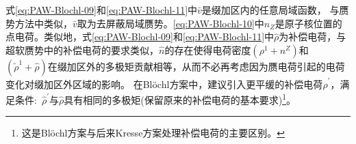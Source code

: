 {式\eqref{eq:PAW-Blochl-09}和\eqref{eq:PAW-Blochl-11}中$\bar v$是缀加区内的任意局域函数，%
与赝势方法中类似，$\bar v$取为去屏蔽局域赝势。\eqref{eq:PAW-Blochl-10}中$n_Z$是原子核位置的点电荷。类似地，式\eqref{eq:PAW-Blochl-09}和\eqref{eq:PAW-Blochl-11}中$\hat\rho$为补偿电荷，与超软赝势中的补偿电荷的要求类似，$\hat n$的存在使得电荷密度$(\rho^1+n^Z)$和$(\tilde\rho^1+\hat\rho)$在缀加区外的多极矩贡献相等，从而不必再考虑因为赝电荷引起的电荷变化对缀加区外区域的影响。%
在\textrm{Bl\"ochl}方案中，建议引入更平缓的补偿电荷$\hat\rho^{\prime}$，满足条件:~$\hat\rho^{\prime}$与$\hat\rho$具有相同的多极矩(保留原来的补偿电荷的基本要求)\footnote{这是\textrm{Bl\"ochl}方案与后来\textrm{Kresse}方案处理补偿电荷的主要区别。}。
}
